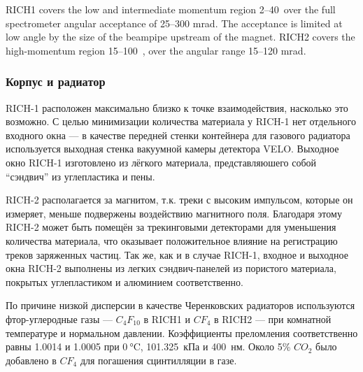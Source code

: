 RICH1 covers the low and intermediate momentum region 2–40~\GeVoverC over the full spectrometer angular acceptance of 25–300 mrad. The acceptance is limited at low angle by the size of the beampipe upstream of the magnet. RICH2 covers the high-momentum region 15–100~\GeVoverC, over the angular range 15–120 mrad.

\subsubsection{Корпус и радиатор}

\mbox{RICH-1} расположен максимально близко к точке взаимодействия, насколько это возможно. С целью минимизации количества материала у \mbox{RICH-1} нет отдельного входного окна --- в качестве передней стенки контейнера для газового радиатора используется выходная стенка вакуумной камеры детектора VELO. Выходное окно \mbox{RICH-1} изготовлено из лёгкого материала, представляюшего собой ``сэндвич'' из углепластика и пены.


\mbox{RICH-2} располагается за магнитом, т.к. треки с высоким импульсом, которые он измеряет, меньше подвержены воздействию магнитного поля. Благодаря этому \mbox{RICH-2} может быть помещён за трекинговыми детекторами для уменьшения количества материала, что оказывает положительное влияние на регистрацию треков заряженных частиц. Так же, как и в случае \mbox{RICH-1}, входное и выходное окна \mbox{RICH-2} выполнены из легких сэндвич-панелей из пористого материала, покрытых углепластиком и алюминием соответственно.


По причине низкой дисперсии в качестве Черенковских радиаторов используются фтор-углеродные газы --- $C_{4}F_{10}$ в RICH1 и $CF_{4}$ в RICH2 --- при комнатной температуре и нормальном давлении. Коэффициенты преломления соответственно равны 1.0014 и 1.0005 при $\SI{0}{\degreeCelsius}$, 101.325~кПа и 400~нм. Около 5\% $CO_{2}$ было добавлено в $CF_{4}$ для погашения сцинтилляции в газе.

